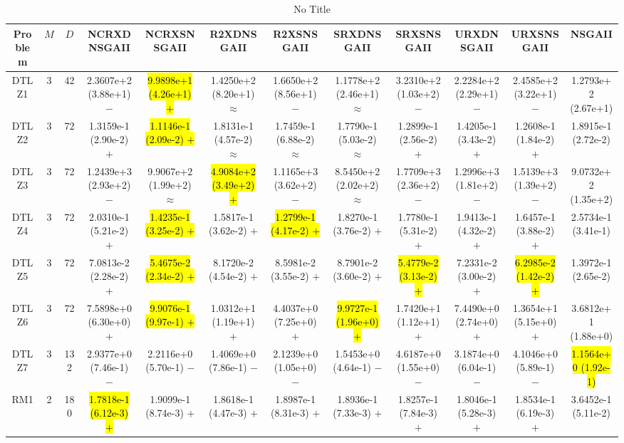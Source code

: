 \documentclass[journal]{IEEEtran}
\begin{document}
\begin{table*}[htbp]
\renewcommand{\arraystretch}{1.2}
\centering
\caption{No Title}
\begin{tabular}{cccccccccccc}
\toprule
Problem&$M$&$D$&NCRXDNSGAII&NCRXSNSGAII&R2XDNSGAII&R2XSNSGAII&SRXDNSGAII&SRXSNSGAII&URXDNSGAII&URXSNSGAII&NSGAII\\
\midrule
\multirow{1}{*}{DTLZ1}&3&42&2.3607e+2 (3.88e+1) $-$&\hl{9.9898e+1 (4.26e+1) $+$}&1.4250e+2 (8.20e+1) $\approx$&1.6650e+2 (8.56e+1) $-$&1.1778e+2 (2.46e+1) $\approx$&3.2310e+2 (1.03e+2) $-$&2.2284e+2 (2.29e+1) $-$&2.4585e+2 (3.22e+1) $-$&1.2793e+2 (2.67e+1)\\
\hline
\multirow{1}{*}{DTLZ2}&3&72&1.3159e-1 (2.90e-2) $+$&\hl{1.1146e-1 (2.09e-2) $+$}&1.8131e-1 (4.57e-2) $\approx$&1.7459e-1 (6.88e-2) $\approx$&1.7790e-1 (5.03e-2) $\approx$&1.2899e-1 (2.56e-2) $+$&1.4205e-1 (3.43e-2) $+$&1.2608e-1 (1.84e-2) $+$&1.8915e-1 (2.72e-2)\\
\hline
\multirow{1}{*}{DTLZ3}&3&72&1.2439e+3 (2.93e+2) $-$&9.9067e+2 (1.99e+2) $\approx$&\hl{4.9084e+2 (3.49e+2) $+$}&1.1165e+3 (3.62e+2) $-$&8.5450e+2 (2.02e+2) $\approx$&1.7709e+3 (2.36e+2) $-$&1.2996e+3 (1.81e+2) $-$&1.5139e+3 (1.39e+2) $-$&9.0732e+2 (1.35e+2)\\
\hline
\multirow{1}{*}{DTLZ4}&3&72&2.0310e-1 (5.21e-2) $+$&\hl{1.4235e-1 (3.25e-2) $+$}&1.5817e-1 (3.62e-2) $+$&\hl{1.2799e-1 (4.17e-2) $+$}&1.8270e-1 (3.76e-2) $+$&1.7780e-1 (5.31e-2) $+$&1.9413e-1 (4.32e-2) $+$&1.6457e-1 (3.88e-2) $+$&2.5734e-1 (3.41e-1)\\
\hline
\multirow{1}{*}{DTLZ5}&3&72&7.0813e-2 (2.28e-2) $+$&\hl{5.4675e-2 (2.34e-2) $+$}&8.1720e-2 (4.54e-2) $+$&8.5981e-2 (3.55e-2) $+$&8.7901e-2 (3.60e-2) $+$&\hl{5.4779e-2 (3.13e-2) $+$}&7.2331e-2 (3.00e-2) $+$&\hl{6.2985e-2 (1.42e-2) $+$}&1.3972e-1 (2.65e-2)\\
\hline
\multirow{1}{*}{DTLZ6}&3&72&7.5898e+0 (6.30e+0) $+$&\hl{9.9076e-1 (9.97e-1) $+$}&1.0312e+1 (1.19e+1) $+$&4.4037e+0 (7.25e+0) $+$&\hl{9.9727e-1 (1.96e+0) $+$}&1.7420e+1 (1.12e+1) $+$&7.4490e+0 (2.74e+0) $+$&1.3654e+1 (5.15e+0) $+$&3.6812e+1 (1.88e+0)\\
\hline
\multirow{1}{*}{DTLZ7}&3&132&2.9377e+0 (7.46e-1) $-$&2.2116e+0 (5.70e-1) $-$&1.4069e+0 (7.86e-1) $-$&2.1239e+0 (1.05e+0) $-$&1.5453e+0 (4.64e-1) $-$&4.6187e+0 (1.55e+0) $-$&3.1874e+0 (6.04e-1) $-$&4.1046e+0 (5.89e-1) $-$&\hl{1.1564e+0 (1.92e-1)}\\
\hline
\multirow{1}{*}{RM1}&2&180&\hl{1.7818e-1 (6.12e-3) $+$}&1.9099e-1 (8.74e-3) $+$&1.8618e-1 (4.47e-3) $+$&1.8987e-1 (8.31e-3) $+$&1.8936e-1 (7.33e-3) $+$&1.8257e-1 (7.84e-3) $+$&1.8046e-1 (5.28e-3) $+$&1.8534e-1 (6.19e-3) $+$&3.6452e-1 (5.11e-2)\\

\end{tabular}
\end{table*}
\end{document}
